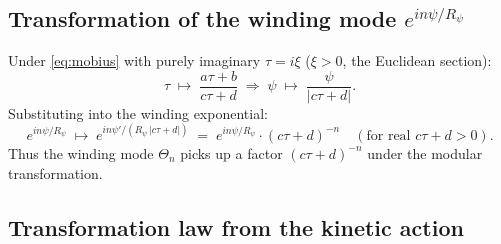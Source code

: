 \documentclass[12pt,a4paper]{article}
\theoremstyle{definition}
\theoremstyle{remark}
\begin{document}
\subsection{Transformation of the winding mode $e^{in\psi/R_\psi}$}

Under \eqref{eq:mobius} with purely imaginary $\tau = i\xi$ ($\xi > 0$,
the Euclidean section):
\begin{equation}
  \tau \;\longmapsto\; \frac{a\tau + b}{c\tau + d}
  \;\Longrightarrow\;
  \psi \;\longmapsto\; \frac{\psi}{|c\tau + d|}.
  \label{eq:psi_transform}
\end{equation}
Substituting into the winding exponential:
\begin{equation}
  e^{in\psi/R_\psi}
  \;\longmapsto\;
  e^{in\psi'/(R_\psi\,|c\tau+d|)}
  \;=\; e^{in\psi/R_\psi} \cdot (c\tau + d)^{-n}
  \quad (\text{for real } c\tau + d > 0).
  \label{eq:winding_transform}
\end{equation}
Thus the winding mode $\Theta_n$ picks up a factor $(c\tau + d)^{-n}$ under
the modular transformation.

\subsection{Transformation law from the kinetic action}
\end{document}
